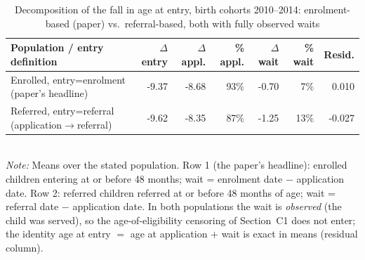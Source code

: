 \begin{table}[htbp]\centering
\caption{Decomposition of the fall in age at entry, birth cohorts 2010--2014: enrolment-based (paper) vs.\ referral-based, both with fully observed waits}
\label{tab:D1}
\footnotesize
\setlength{\tabcolsep}{4pt}
\begin{tabular}{lrrrrrr}
\toprule
Population / entry definition & $\Delta$ entry & $\Delta$ appl. & \% appl. & $\Delta$ wait & \% wait & Resid. \\
\midrule
Enrolled, entry=enrolment (paper's headline) & -9.37 & -8.68 & 93\% & -0.70 & 7\% & 0.010 \\
Referred, entry=referral (application$\to$referral) & -9.62 & -8.35 & 87\% & -1.25 & 13\% & -0.027 \\
\bottomrule
\end{tabular}
\\[3pt]{\footnotesize \textit{Note:} Means over the stated population. Row 1 (the paper's headline): enrolled children entering at or before 48 months; wait = enrolment date $-$ application date. Row 2: referred children referred at or before 48 months of age; wait = referral date $-$ application date. In both populations the wait is \emph{observed} (the child was served), so the age-of-eligibility censoring of Section~C1 does not enter; the identity age at entry $=$ age at application $+$ wait is exact in means (residual column).}
\end{table}
